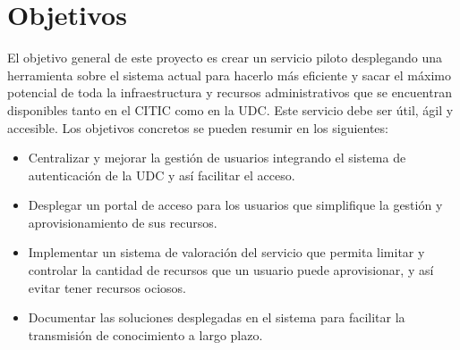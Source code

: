 \section{Objetivos}
El objetivo general de este proyecto es crear un servicio piloto desplegando una herramienta sobre el sistema actual para hacerlo más eficiente y sacar el máximo potencial de toda la infraestructura y recursos administrativos que se encuentran disponibles tanto en el CITIC como en la UDC. Este servicio debe ser útil, ágil y accesible.
Los objetivos concretos se pueden resumir en los siguientes:
\begin{itemize}
    \item Centralizar y mejorar la gestión de usuarios integrando el sistema de autenticación de la UDC y así facilitar el acceso.
    \item Desplegar un portal de acceso para los usuarios que simplifique la gestión y aprovisionamiento de sus recursos.
    \item Implementar un sistema de valoración del servicio que permita limitar y controlar la cantidad de recursos que un usuario puede aprovisionar, y así evitar tener recursos ociosos.
    \item Documentar las soluciones desplegadas en el sistema para facilitar la transmisión de conocimiento a largo plazo.
\end{itemize}

